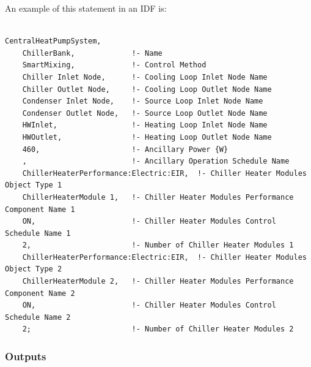 An example of this statement in an IDF is:

\begin{lstlisting}

CentralHeatPumpSystem,
    ChillerBank,             !- Name
    SmartMixing,             !- Control Method
    Chiller Inlet Node,      !- Cooling Loop Inlet Node Name
    Chiller Outlet Node,     !- Cooling Loop Outlet Node Name
    Condenser Inlet Node,    !- Source Loop Inlet Node Name
    Condenser Outlet Node,   !- Source Loop Outlet Node Name
    HWInlet,                 !- Heating Loop Inlet Node Name
    HWOutlet,                !- Heating Loop Outlet Node Name
    460,                     !- Ancillary Power {W}
    ,                        !- Ancillary Operation Schedule Name
    ChillerHeaterPerformance:Electric:EIR,  !- Chiller Heater Modules Object Type 1
    ChillerHeaterModule 1,   !- Chiller Heater Modules Performance Component Name 1
    ON,                      !- Chiller Heater Modules Control Schedule Name 1
    2,                       !- Number of Chiller Heater Modules 1
    ChillerHeaterPerformance:Electric:EIR,  !- Chiller Heater Modules Object Type 2
    ChillerHeaterModule 2,   !- Chiller Heater Modules Performance Component Name 2
    ON,                      !- Chiller Heater Modules Control Schedule Name 2
    2;                       !- Number of Chiller Heater Modules 2
\end{lstlisting}

\subsubsection{Outputs}\label{outputs-17-000}

